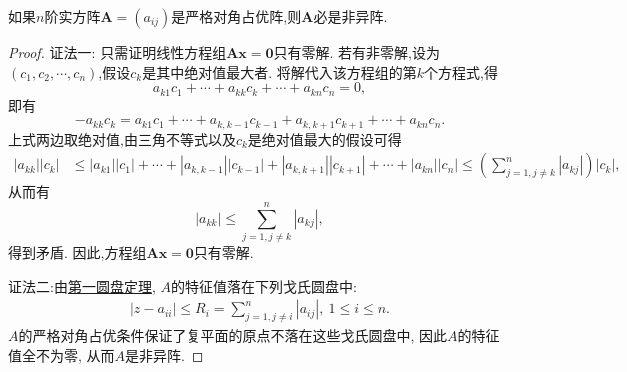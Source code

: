 \documentclass[../../main.tex]{subfiles}
\begin{document}
\begin{proposition}[严格对角占优阵必是非异阵]\label{proposition:严格对角占优阵必是非异阵}
如果\(n\)阶实方阵\(\boldsymbol{A}=(a_{ij})\)是严格对角占优阵,则\(\boldsymbol{A}\)必是非异阵.
\end{proposition}
\begin{proof}
{\color{blue}证法一:}
只需证明线性方程组\(\boldsymbol{A}\boldsymbol{x}=\boldsymbol{0}\)只有零解. 若有非零解,设为\((c_1,c_2,\cdots,c_n)\),假设\(c_k\)是其中绝对值最大者. 将解代入该方程组的第\(k\)个方程式,得
\[
a_{k1}c_1+\cdots + a_{kk}c_k+\cdots + a_{kn}c_n = 0,
\]
即有
\[
-a_{kk}c_k=a_{k1}c_1+\cdots + a_{k,k - 1}c_{k - 1}+a_{k,k + 1}c_{k + 1}+\cdots + a_{kn}c_n.
\]
上式两边取绝对值,由三角不等式以及\(c_k\)是绝对值最大的假设可得
\begin{align*}
|a_{kk}||c_k|&\leqslant |a_{k1}||c_1|+\cdots + |a_{k,k - 1}||c_{k - 1}|+|a_{k,k + 1}||c_{k + 1}|+\cdots + |a_{kn}||c_n|\leqslant \left(\sum_{j = 1,j\neq k}^{n}|a_{kj}|\right)|c_k|,
\end{align*}
从而有
\[
|a_{kk}|\leqslant \sum_{j = 1,j\neq k}^{n}|a_{kj}|,
\]
得到矛盾. 因此,方程组\(\boldsymbol{A}\boldsymbol{x}=\boldsymbol{0}\)只有零解.

{\color{blue}证法二:}由\hyperref[theorem:第一圆盘定理]{第一圆盘定理}, \(A\)的特征值落在下列戈氏圆盘中:
\begin{align*}
|z - a_{ii}| \leqslant  R_{i} = \sum_{j = 1,j\neq i}^{n}|a_{ij}|,\ 1 \leqslant  i \leqslant  n.
\end{align*}
\(A\)的严格对角占优条件保证了复平面的原点不落在这些戈氏圆盘中, 因此\(A\)的特征值全不为零, 从而\(A\)是非异阵.
\end{proof}
\end{document}
